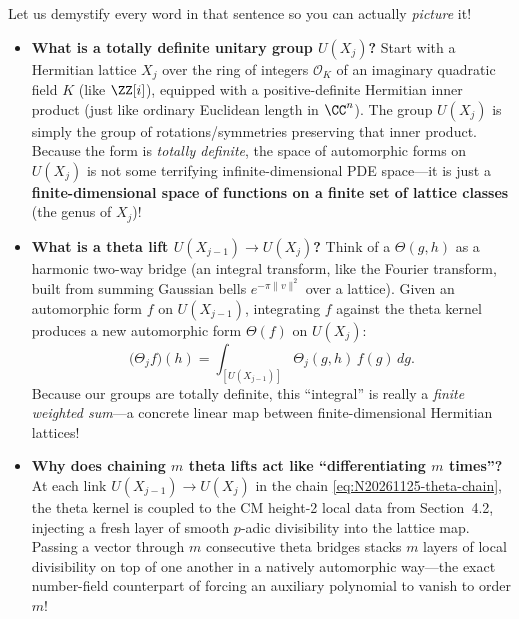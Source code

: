 Let us demystify every word in that sentence so you can actually \emph{picture} it!
\begin{itemize}
  \item \textbf{What is a totally definite unitary group \(U(X_j)\)?} Start with a Hermitian lattice \(X_j\) over the ring of integers \(\mathcal{O}_K\) of an imaginary quadratic field \(K\) (like \(\ZZ[i]\)), equipped with a positive-definite Hermitian inner product (just like ordinary Euclidean length in \(\CC^n\)). The group \(U(X_j)\) is simply the group of rotations/symmetries preserving that inner product. Because the form is \emph{totally definite}, the space of automorphic forms on \(U(X_j)\) is not some terrifying infinite-dimensional PDE space---it is just a \textbf{finite-dimensional space of functions on a finite set of lattice classes} (the genus of \(X_j\))!
  \item \textbf{What is a theta lift \(U(X_{j-1}) \to U(X_j)\)?} Think of a  \(\Theta(g, h)\) as a harmonic two-way bridge (an integral transform, like the Fourier transform, built from summing Gaussian bells \(e^{-\pi \|v\|^2}\) over a lattice). Given an automorphic form \(f\) on \(U(X_{j-1})\), integrating \(f\) against the theta kernel produces a new automorphic form \(\Theta(f)\) on \(U(X_j)\):
  \[
    \bigl(\Theta_j f\bigr)(h) = \int_{[U(X_{j-1})]} \Theta_j(g, h)\, f(g)\,dg.
  \]
  Because our groups are totally definite, this ``integral'' is really a \emph{finite weighted sum}---a concrete linear map between finite-dimensional Hermitian lattices!
  \item \textbf{Why does chaining \(m\) theta lifts act like ``differentiating \(m\) times''?} At each link \(U(X_{j-1}) \to U(X_j)\) in the chain \eqref{eq:N20261125-theta-chain}, the theta kernel is coupled to the CM height-2 local data from Section~4.2, injecting a fresh layer of smooth \(p\)-adic divisibility into the lattice map. Passing a vector through \(m\) consecutive theta bridges stacks \(m\) layers of local divisibility on top of one another in a natively automorphic way---the exact number-field counterpart of forcing an auxiliary polynomial to vanish to order \(m\)!
\end{itemize}


